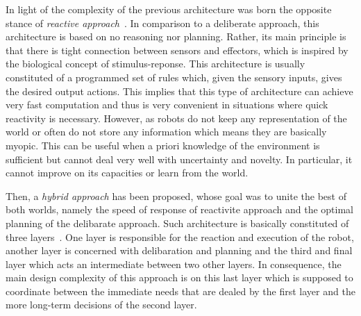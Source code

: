 
    In light of the complexity of the previous architecture was born the opposite stance of \emph{reactive approach}~\cite{Brooks1986}. In comparison to a deliberate approach, this architecture is based on no reasoning nor planning. Rather, its main principle is that there is tight connection between sensors and effectors, which is inspired by the biological concept of stimulus-reponse. This architecture is usually constituted of a programmed set of rules which, given the sensory inputs, gives the desired output actions. This implies that this type of architecture can achieve very fast computation and thus is very convenient in situations where quick reactivity is necessary. However, as robots do not keep any representation of the world or often do not store any information which means they are basically myopic. This can be useful when a priori knowledge of the environment is sufficient but cannot deal very well with uncertainty and novelty. In particular, it cannot improve on its capacities or learn from the world.

    Then, a \emph{hybrid approach} has been proposed, whose goal was to unite the best of both worlds, namely the speed of response of reactivite approach and the optimal planning of the delibarate approach. Such architecture is basically constituted of three layers~\cite{Mataric2008}. One layer is responsible for the reaction and execution of the robot, another layer is concerned with delibaration and planning and the third and final layer which acts an intermediate between two other layers. In consequence, the main design complexity of this approach is on this last layer which is supposed to coordinate between the immediate needs that are dealed by the first layer and the more long-term decisions of the second layer.

